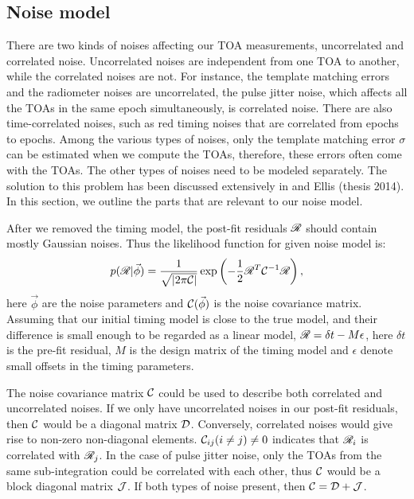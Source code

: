 \subsection{Noise model}
\label{sec:noise}
{\bfref 
There are two kinds of noises affecting our TOA measurements, uncorrelated
and correlated noise. Uncorrelated noises are 
independent from one TOA to another, while the correlated noises are not. 
For instance, the template matching errors and the radiometer noises are 
uncorrelated, the pulse jitter noise, which affects all the TOAs 
in the same epoch simultaneously, is correlated noise.
There are also time-correlated noises, such as red timing noises that are
correlated from epochs to epochs. Among the various types of noises, only the
template matching error $\sigma$ can be estimated when we compute the TOAs, therefore,
these errors often come with the TOAs. The other types of noises need to be modeled
separately.
The solution to this problem has been discussed extensively in \citet{vl13, ell13, vv14a, vv14, abb+14} and Ellis (thesis 2014). In this section, we outline the parts that are relevant to our noise model.


After we removed the timing model, the post-fit 
residuals $\mathscr{R}$ should contain mostly Gaussian noises. Thus the 
likelihood function for given noise model is:
\begin{equation}
\label{eq:bigC}
p(\mathscr{R}|\vec \phi) = \frac{1}{\sqrt{|2 \pi \mathcal{C}|}}
\exp\left(-\frac{1}{2}\mathscr{R}^T \mathcal{C}^{-1} \mathscr{R} \right),
\end{equation}
here $\vec \phi$ are the noise parameters and $\mathcal{C}(\vec \phi)$ is the noise
covariance matrix. 
Assuming that our initial timing model is close to the true model, and their
difference is small enough to be regarded as a linear model, $\mathscr{R}=\delta t
 - M \epsilon$, here $\delta t$ is the pre-fit residual,
$M$ is the design matrix of the timing model and $\epsilon$ denote small
offsets in the timing parameters. 

The noise covariance matrix $\mathcal{C}$ could be used to describe both
correlated and uncorrelated noises. If we only have uncorrelated noises in our
post-fit residuals, then $\mathcal{C}$ would be a diagonal matrix $\mathcal{D}$. Conversely, correlated
noises would give rise to non-zero non-diagonal elements. $\mathcal{C}_{ij}(i\neq
j)\neq 0$ indicates that $\mathscr{R}_{i}$ is correlated with $\mathscr{R}_{j}$. In the case
of pulse jitter noise, only the TOAs from the same sub-integration could be correlated
with each other, thus $\mathcal{C}$ would be a block diagonal matrix $\mathcal{J}$. If both types
of noise present, then $\mathcal{C} = \mathcal{D} + \mathcal{J}$.

}
